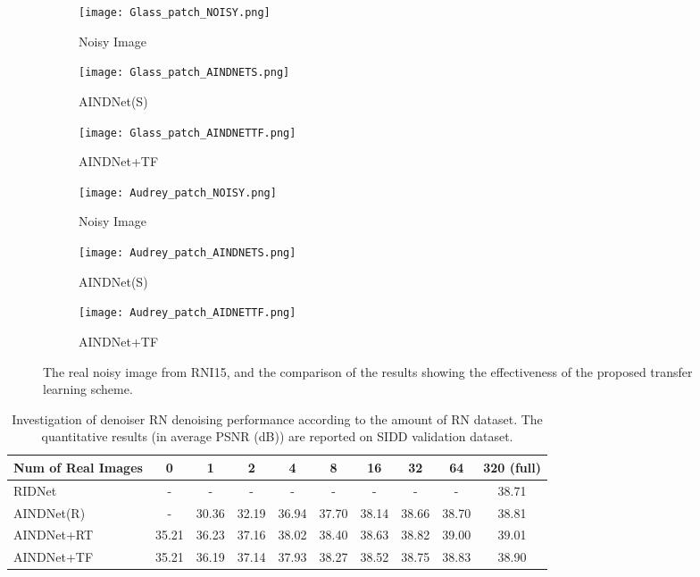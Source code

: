 \documentclass[10pt,twocolumn,letterpaper]{article}
\begin{document}
\begin{figure}[t]
	\centering	
	\begin{subfigure}[b]{0.31\linewidth}		
		\texttt{[image: Glass\_patch\_NOISY.png]}
		\caption{Noisy Image}		
	\end{subfigure}	
	\begin{subfigure}[b]{0.31\linewidth}		
		\texttt{[image: Glass\_patch\_AINDNETS.png]}
		\caption{AINDNet(S)}		
	\end{subfigure}	
	\begin{subfigure}[b]{0.31\linewidth}		
		\texttt{[image: Glass\_patch\_AINDNETTF.png]} 
		\caption{AINDNet+TF}		
	\end{subfigure}		
	\begin{subfigure}[b]{0.31\linewidth}		
		\texttt{[image: Audrey\_patch\_NOISY.png]} 
		\caption{Noisy Image}		
	\end{subfigure}	
	\begin{subfigure}[b]{0.31\linewidth}		
		\texttt{[image: Audrey\_patch\_AINDNETS.png]} 
		\caption{AINDNet(S)}		
	\end{subfigure}	
	\begin{subfigure}[b]{0.31\linewidth}		
		\texttt{[image: Audrey\_patch\_AIDNETTF.png]}
		\caption{AINDNet+TF}		
	\end{subfigure}		
	\caption{The real noisy image from RNI15, and the comparison of the results showing the effectiveness of the proposed transfer learning scheme.}
	\label{fig:comparison2}
\end{figure}
\begin{table*}[t]
	\centering
	\caption{Investigation of denoiser RN denoising performance according to the amount of RN dataset. The quantitative results (in average PSNR (dB)) are reported on SIDD validation dataset. }
	\label{table:Ablation2}
	\begin{adjustbox}{width=0.7\linewidth}
		\begin{tabular}{lccccccccc}
			\toprule			
			Num of Real Images &  0  & 1 & 2& 4 &8 &16 & 32 & 64 & 320 (full) \\
			\midrule
			RIDNet & - & - & - & - & - & - & - & - & 38.71  \\
			AINDNet(R) &  -  & 30.36 &	32.19 &	36.94 &	37.70 &	38.14 &	38.66 &	38.70 &	38.81 \\
			AINDNet+RT & 35.21 &	36.23 &	37.16 &	38.02 &	38.40 &	38.63 &	38.82 &	39.00 &	39.01  \\			
			AINDNet+TF & 35.21 &	36.19 &	37.14 &	37.93 &	38.27 &	38.52 &	38.75 &	38.83 &	38.90  \\
			
			\bottomrule					
		\end{tabular}
	\end{adjustbox}
\end{table*}
\end{document}
